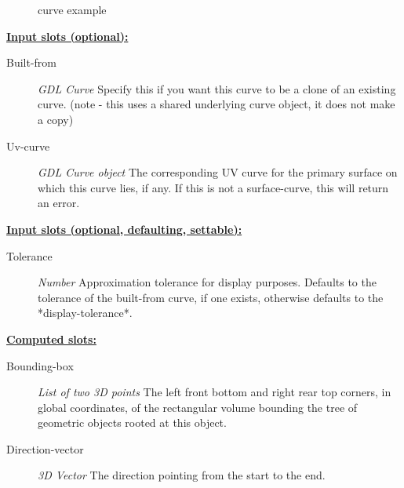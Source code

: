 \documentclass [11pt]{book}
\begin{document}
\begin{itemize}
\begin{figure}
\caption{curve example}

\label{fig:curve}

\end{figure}





\textbf{
\underline{Input slots (optional):}}

\begin{description}

\item [Built-from]
\emph{GDL Curve} Specify this if you want this curve to be a clone of an existing curve. (note - this uses a shared underlying
curve object, it does not make a copy)


\item [Uv-curve]
\emph{GDL Curve object} The corresponding UV curve for the primary surface on which this curve lies, if any. If
this is not a surface-curve, this will return an error.


\end{description}






\textbf{
\underline{Input slots (optional, defaulting, settable):}}

\begin{description}

\item [Tolerance]
\emph{Number} Approximation tolerance for display purposes. Defaults to the tolerance of the
built-from curve, if one exists, otherwise defaults to the *display-tolerance*.


\end{description}






\textbf{
\underline{Computed slots:}}

\begin{description}

\item [Bounding-box]
\emph{List of two 3D points} The left front bottom and right rear top corners, in global coordinates,
of the rectangular volume bounding the tree of geometric objects rooted at this object.


\item [Direction-vector]
\emph{3D Vector} The direction pointing from the start to the end.



\end{description}
\end{itemize}
\end{document}
